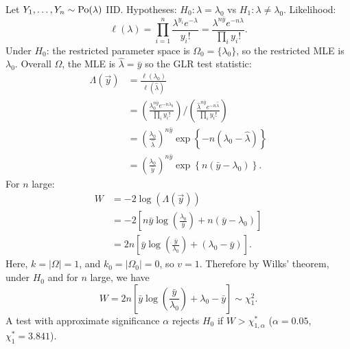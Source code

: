 \documentclass[10pt, a4paper]{article}
\begin{document}
\begin{example}
    Let $Y_1, \dotsc, Y_n \sim \operatorname{Po}(\lambda)$ IID.
    Hypotheses:
    $H_0 : \lambda = \lambda_0$ vs $H_1 : \lambda \neq \lambda_0$.
    Likelihood:
    \[
    \ell(\lambda) = \prod_{i = 1}^{n}\frac{\lambda ^ {y_i}e ^ {-\lambda}}{y_i!} = \frac{\lambda ^ {n\bar{y}}e ^ {-n\lambda}}{\prod_{i}y_i!}.
    \]
    Under $H_0$:
    the restricted parameter space is $\Omega_0 = \{\lambda_0\}$,
    so the restricted MLE is $\lambda_0$.
    Overall $\Omega$,
    the MLE is $\hat{\lambda} = \bar{y}$ so the GLR test statistic:
    \begin{align*}
        \Lambda(\vec{y}) &= \frac{\ell(\lambda_0)}{\ell(\hat{\lambda})} \\
        &= \left(\frac{\lambda_0 ^ {n\bar{y}}e ^ {-n\lambda_0}}{\prod_{i}y_i!}\right) / \left(\frac{\hat{\lambda} ^ {n\bar{y}}e ^ {-n\hat{\lambda}}}{\prod_{i}y_i!}\right) \\
        &= \left(\frac{\lambda_0}{\hat{\lambda}}\right) ^ {n\bar{y}}\exp\left\{-n(\lambda_0 - \hat{\lambda})\right\} \\
        &= \left(\frac{\lambda_0}{\bar{y}}\right) ^ {n\bar{y}}\exp\left\{n(\bar{y} - \lambda_0)\right\}.
    \end{align*}
    For $n$ large:
    \begin{align*}
        W &= -2\log(\Lambda(\vec{y})) \\
        &= -2\left[n\bar{y}\log\left(\frac{\lambda_0}{\bar{y}}\right) + n(\bar{y} - \lambda_0)\right] \\
        &= 2n\left[\bar{y}\log\left(\frac{\bar{y}}{\lambda_0}\right) + (\lambda_0 - \bar{y})\right].
    \end{align*}
    Here,
    $k = |\Omega| = 1$,
    and $k_0 = |\Omega_0| = 0$,
    so $v = 1$.
    Therefore by Wilks' theorem,
    under $H_0$ and for $n$ large,
    we have
    \[
    W = 2n\left[\bar{y}\log\left(\frac{\bar{y}}{\lambda_0}\right) + \lambda_0 - \bar{y}\right] \sim \chi_{1}^{2}.
    \]
    A test with approximate significance $\alpha$ rejects $H_0$ if $W > \chi_{1, \alpha}^{*}$
    ($\alpha = 0.05$,
    $\chi_{1}^{*} = 3.841$).
\end{example}
\end{document}
